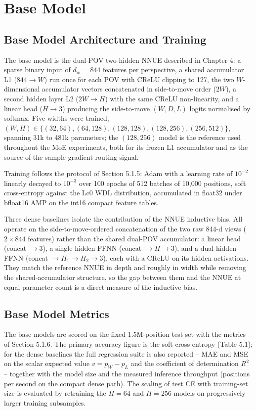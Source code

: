 \section{Base Model}

\subsection{Base Model Architecture and Training}

The base model is the dual-POV two-hidden NNUE described in Chapter 4: a sparse binary input of $d_{\text{in}}=844$ features per perspective, a shared accumulator L1 ($844 \to W$) run once for each POV with CReLU clipping to 127, the two $W$-dimensional accumulator vectors concatenated in side-to-move order ($2W$), a second hidden layer L2 ($2W \to H$) with the same CReLU non-linearity, and a linear head ($H \to 3$) producing the side-to-move $(W,D,L)$ logits normalised by softmax. Five widths were trained, $(W,H) \in \{(32,64),(64,128),(128,128),(128,256),(256,512)\}$, spanning 31k to 481k parameters; the $(128,256)$ model is the reference used throughout the MoE experiments, both for its frozen L1 accumulator and as the source of the sample-gradient routing signal.

Training follows the protocol of Section 5.1.5: Adam with a learning rate of $10^{-2}$ linearly decayed to $10^{-3}$ over 100 epochs of 512 batches of 10,000 positions, soft cross-entropy against the Lc0 WDL distribution, accumulated in float32 under bfloat16 AMP on the int16 compact feature tables.

Three dense baselines isolate the contribution of the NNUE inductive bias. All operate on the side-to-move-ordered concatenation of the two raw 844-d views ($2\times844$ features) rather than the shared dual-POV accumulator: a linear head (concat $\to 3$), a single-hidden FFNN (concat $\to H \to 3$), and a dual-hidden FFNN (concat $\to H_1 \to H_2 \to 3$), each with a CReLU on its hidden activations. They match the reference NNUE in depth and roughly in width while removing the shared-accumulator structure, so the gap between them and the NNUE at equal parameter count is a direct measure of the inductive bias.

\subsection{Base Model Metrics}

The base models are scored on the fixed 1.5M-position test set with the metrics of Section 5.1.6. The primary accuracy figure is the soft cross-entropy (Table 5.1); for the dense baselines the full regression suite is also reported -- MAE and MSE on the scalar expected value $v = p_W - p_L$ and the coefficient of determination $R^2$ -- together with the model size and the measured inference throughput (positions per second on the compact dense path). The scaling of test CE with training-set size is evaluated by retraining the $H=64$ and $H=256$ models on progressively larger training subsamples.

